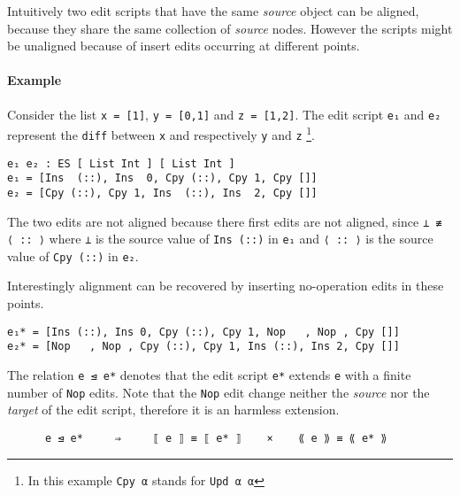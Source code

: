 \documentclass[preprint]{sigplanconf}
\begin{document}
        Intuitively two edit scripts that have the same \emph{source} object
        can be aligned, because they share the same collection of \emph{source} nodes.
        However the scripts might be unaligned because of insert edits occurring
        at different points. 

        \paragraph{Example}
        Consider the list \texttt{x = [1]}, \texttt{y = [0,1]} and \texttt{z = [1,2]}.
        The edit script \texttt{e₁} and \texttt{e₂} represent the \texttt{diff} between \texttt{x} and
        respectively \texttt{y} and \texttt{z} \footnote{In this example \texttt{Cpy α} stands for \texttt{Upd α α}}.

\begin{verbatim}
e₁ e₂ : ES [ List Int ] [ List Int ]
e₁ = [Ins  (::), Ins  0, Cpy (::), Cpy 1, Cpy []]
e₂ = [Cpy (::), Cpy 1, Ins  (::), Ins  2, Cpy []] 
\end{verbatim}       

        The two edits are not aligned because there first edits are not aligned, since \texttt{⊥ ≢ ⟨ :: ⟩}
        where \texttt{⊥} is the source value of \texttt{Ins (::)} in \texttt{e₁} and \texttt{⟨ :: ⟩} is
        the source value of \texttt{Cpy (::)} in \texttt{e₂}.

        Interestingly alignment can be recovered by inserting no-operation edits in 
        these points. 
\begin{verbatim}
e₁* = [Ins (::), Ins 0, Cpy (::), Cpy 1, Nop   , Nop , Cpy []]
e₂* = [Nop   , Nop , Cpy (::), Cpy 1, Ins (::), Ins 2, Cpy []] 
\end{verbatim}
        The relation \texttt{e ⊴ e*} denotes that the edit script \texttt{e*}
        extends \texttt{e} with a finite number of \texttt{Nop} edits.
        Note that the \texttt{Nop} edit change neither the \emph{source} nor 
        the \emph{target} of the edit script, therefore it is an harmless 
        extension.
        
\begin{verbatim}
      e ⊴ e*     ⇒     ⟦ e ⟧ ≡ ⟦ e* ⟧    ×    ⟪ e ⟫ ≡ ⟪ e* ⟫ 
\end{verbatim}
\end{document}

